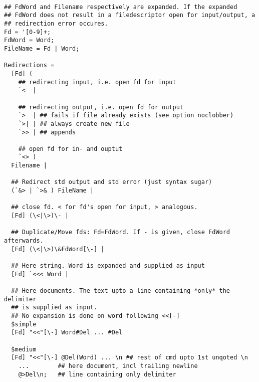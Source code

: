 \documentclass{article}
\begin{document}
\begin{verbatim}
        
## FdWord and Filename respectively are expanded. If the expanded
## FdWord does not result in a filedescriptor open for input/output, a
## redirection error occures.
Fd = '[0-9]+;			
FdWord = Word;        
FileName = Fd | Word;
        
Redirections =	
  [Fd] (
    ## redirecting input, i.e. open fd for input        
    `<  |
  
    ## redirecting output, i.e. open fd for output
    `>  | ## fails if file already exists (see option noclobber)
    `>| | ## always create new file
    `>> | ## appends
        
    ## open fd for in- and ouptut       
    `<> )
  Filename |
        
  ## Redirect std output and std error (just syntax sugar)
  (`&> | `>& ) FileName |       
        
  ## close fd. < for fd's open for input, > analogous. 
  [Fd] (\<|\>)\- |
        
  ## Duplicate/Move fds: Fd=FdWord. If - is given, close FdWord afterwards.
  [Fd] (\<|\>)\&FdWord[\-] |
        
  ## Here string. Word is expanded and supplied as input
  [Fd] `<<< Word | 
        
  ## Here documents. The text upto a line containing *only* the delimiter
  ## is supplied as input.
  ## No expansion is done on word following <<[-]
  $simple
  [Fd] "<<"[\-] Word#Del ... #Del     
        
  $medium      
  [Fd] "<<"[\-] @Del(Word) ... \n ## rest of cmd upto 1st unqoted \n
    ...        ## here document, incl trailing newline
    @>Del\n;   ## line containing only delimiter  
\end{verbatim}
\end{document}
